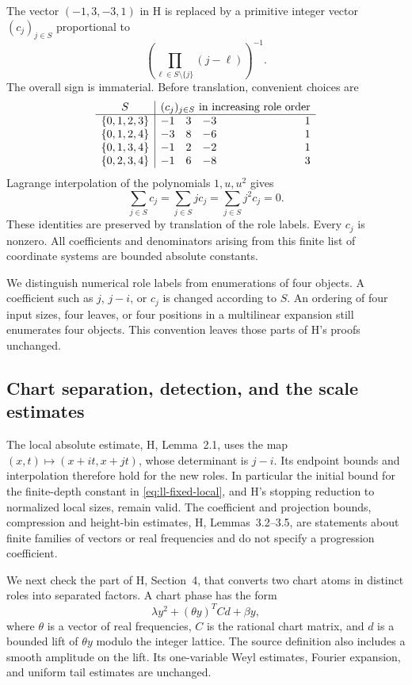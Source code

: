 The vector $(-1,3,-3,1)$ in H is replaced by a primitive integer vector
$(c_j)_{j\in S}$ proportional to
\[
 \left(\prod_{\ell\in S\setminus\{j\}}(j-\ell)\right)^{-1}.
\]
The overall sign is immaterial.  Before translation, convenient choices
are
\begin{equation}
\begin{array}{c|rrrr}
 S&\multicolumn{4}{c}{(c_j)_{j\in S}\text{ in increasing role order}}\\ \hline
 \{0,1,2,3\}&-1&3&-3&1\\
 \{0,1,2,4\}&-3&8&-6&1\\
 \{0,1,3,4\}&-1&2&-2&1\\
 \{0,2,3,4\}&-1&6&-8&3
\end{array}
\label{eq:ll-coefficient-table}
\end{equation}
Lagrange interpolation of the polynomials $1,u,u^2$ gives
\begin{equation}
 \sum_{j\in S}c_j=\sum_{j\in S}jc_j=
 \sum_{j\in S}j^2c_j=0.
 \label{eq:ll-moments}
\end{equation}
These identities are preserved by translation of the role labels.
Every $c_j$ is nonzero.  All coefficients and denominators arising
from this finite list of coordinate systems are bounded absolute
constants.

We distinguish numerical role labels from enumerations of four
objects.  A coefficient such as $j$, $j-i$, or $c_j$ is changed according
to $S$.  An ordering of four input sizes, four leaves, or four positions
in a multilinear expansion still enumerates four objects.  This
convention leaves those parts of H's proofs unchanged.

\subsection{Chart separation, detection, and the scale estimates}

The local absolute estimate, H, Lemma~2.1, uses the map
$(x,t)\mapsto(x+it,x+jt)$, whose determinant is $j-i$.  Its endpoint
bounds and interpolation therefore hold for the new roles.  In
particular the initial bound for the finite-depth constant in
\eqref{eq:ll-fixed-local}, and H's stopping reduction to normalized
local sizes, remain valid.  The coefficient and projection bounds,
compression and height-bin estimates, H, Lemmas~3.2--3.5, are
statements about finite families of vectors or real frequencies and do
not specify a progression coefficient.

We next check the part of H, Section~4, that converts two chart atoms
in distinct roles into separated factors.  A chart phase has the form
\[
 \lambda y^2+(\theta y)^TCd+\beta y,
\]
where $\theta$ is a vector of real frequencies, $C$ is the rational
chart matrix, and $d$ is a bounded lift of $\theta y$ modulo the
integer lattice.  The source definition also includes a smooth
amplitude on the lift.  Its one-variable Weyl estimates, Fourier
expansion, and uniform tail estimates are unchanged.

